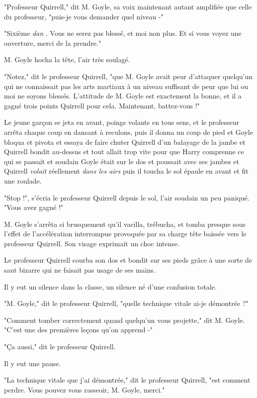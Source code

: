 "Professeur Quirrell," dit M. Goyle, sa voix maintenant autant amplifiée que celle du professeur, "puis-je vous demander quel niveau -"

"Sixième \emph{dan} . Vous ne serez pas blessé, et moi non plus. Et si vous voyez une ouverture, merci de la prendre."

M. Goyle hocha la tête, l'air très soulagé.

"Notez," dit le professeur Quirrell, "que M. Goyle avait peur d'attaquer quelqu'un qui ne connaissait pas les arts martiaux à un niveau suffisant de peur que lui ou moi ne soyons blessés. L'attitude de M. Goyle est exactement la bonne, et il a gagné trois points Quirrell pour cela. Maintenant, battez-vous !"

Le jeune garçon se jeta en avant, poings volants en tous sens, et le professeur arrêta chaque coup en dansant à reculons, puis il donna un coup de pied et Goyle bloqua et pivota et essaya de faire chuter Quirrell d'un balayage de la jambe et Quirrell bondit au-dessus et tout allait trop vite pour que Harry comprenne ce qui se passait et soudain Goyle était sur le dos et poussait avec ses jambes et Quirrell \emph{volait } réellement \emph{dans les airs}  puis il toucha le sol épaule en avant et fit une roulade.

"Stop !", s'écria le professeur Quirrell depuis le sol, l'air soudain un peu paniqué. "Vous avez gagné !"

M. Goyle s'arrêta si brusquement qu'il vacilla, trébucha, et tomba presque sous l'effet de l'accélération interrompue provoquée par sa charge tête baissée vers le professeur Quirrell. Son visage exprimait un choc intense.

Le professeur Quirrell courba son dos et bondit sur ses pieds grâce à une sorte de saut bizarre qui ne faisait pas usage de ses mains.

Il y eut un silence dans la classe, un silence né d'une confusion totale.

"M. Goyle," dit le professeur Quirrell, "quelle technique vitale ai-je démontrée ?"

"Comment tomber correctement quand quelqu'un vous projette," dit M. Goyle. "C'est une des premières leçons qu'on apprend -"

"Ça aussi," dit le professeur Quirrell.

Il y eut une pause.

"La technique vitale que j'ai démontrée," dit le professeur Quirrell, "est comment perdre. Vous pouvez vous rasseoir, M. Goyle, merci."

